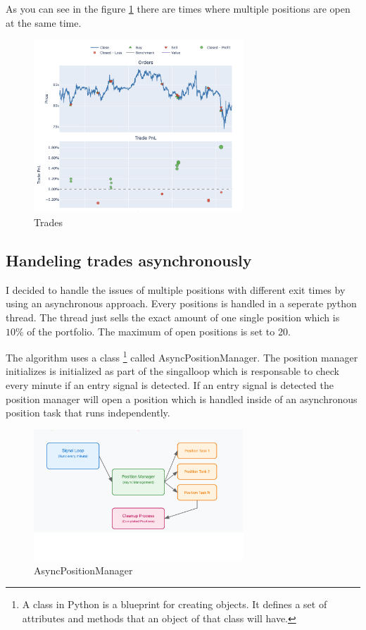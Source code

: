 \documentclass[12pt]{article}
\begin{document}
As you can see in the figure \ref{fig:trades} there are times where multiple positions are open at the same time.
\begin{figure}[H]
  \centering
  \includegraphics[width=0.7\textwidth]{imgs/tradesVisualised.png}
  \caption{Trades}
  \label{fig:trades}
\end{figure}



\subsection{Handeling trades asynchronously}
I decided to handle the issues of multiple positions with different exit times by using an asynchronous approach. Every positions is handled in a seperate python thread. The thread just sells the exact amount of one single position which is $10\%$ of the portfolio. The maximum of open positions is set to 20.


The algorithm uses a class \footnote{A class in Python is a blueprint for creating objects. It defines a set of attributes and methods that an object of that class will have.} called AsyncPositionManager. The position manager initializes is initialized as part of the singalloop which is responsable to check every minute if an entry signal is detected. If an entry signal is detected the position manager will open a position which is handled inside of an asynchronous position task that runs independently.

\begin{figure}[H]
  \centering
  \includegraphics[width=0.7\textwidth]{imgs/async_pos_handeling.png}
  \caption{AsyncPositionManager}
  \label{fig:asyncPositionManager}
\end{figure}
\end{document}
